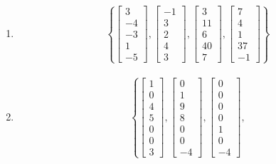 \documentclass{article}
\begin{document}
\begin{enumerate}[label = \textbf{ basis $ W_\arabic*^\perp $: }]
	\item
		\begin{align*}
			\left\{
				\begin{bmatrix} 3 \\ -4 \\ -3 \\ 1 \\ -5 \end{bmatrix},
				\begin{bmatrix} -1 \\ 3 \\ 2 \\ 4 \\ 3 \end{bmatrix},
				\begin{bmatrix} 3 \\ 11 \\ 6 \\ 40 \\ 7 \end{bmatrix},
				\begin{bmatrix} 7 \\ 4 \\ 1 \\ 37 \\ -1 \end{bmatrix}
			\right\}
		\end{align*}
	\item
		\begin{align*}
			\left\{
				\begin{bmatrix} 1 \\ 0 \\ 4 \\ 5 \\ 0 \\ 0 \\ 3 \end{bmatrix},
				\begin{bmatrix} 0 \\ 1 \\ 9 \\ 8 \\ 0 \\ 0 \\ -4 \end{bmatrix},
				\begin{bmatrix} 0 \\ 0 \\ 0 \\ 0 \\ 1 \\ 0 \\ -4 \end{bmatrix},

\end{align*}
\end{enumerate}
\end{document}

